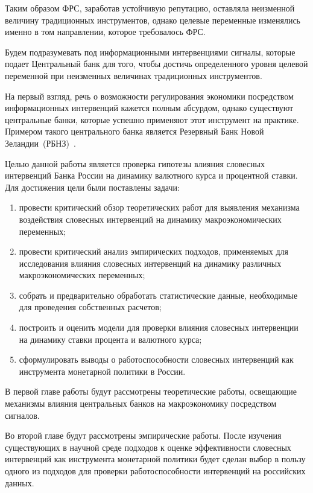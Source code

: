 Таким образом ФРС, заработав устойчивую репутацию, оставляла неизменной величину традиционных инструментов, однако целевые переменные изменялись именно в том направлении, которое требовалось ФРС.

Будем подразумевать под информационными интервенциями сигналы, которые подает Центральный банк для того, чтобы достичь определенного уровня целевой переменной при неизменных величинах традиционных инструментов.

На первый взгляд, речь о возможности регулирования экономики посредством информационных интервенций кажется полным абсурдом, однако существуют центральные банки, которые успешно применяют этот инструмент на практике. Примером такого центрального банка является Резервный Банк Новой Зеландии~(РБНЗ)~\cite{guthrie2000open}.

Целью данной работы является проверка гипотезы влияния словесных интервенций Банка России на динамику валютного курса и процентной ставки. Для достижения цели были поставлены задачи: 

\begin{enumerate}
\item провести критический обзор теоретических работ для выявления механизма воздействия словесных интервенций на динамику макроэкономических переменных;

\item провести критический анализ эмпирических подходов, применяемых для исследования влияния словесных интервенций на динамику различных макроэкономических переменных;

\item собрать и предварительно обработать статистические данные, необходимые для проведения собственных расчетов;

\item построить и оценить модели для проверки влияния словесных интервенции на динамику ставки процента и валютного курса;

\item сформулировать выводы о работоспособности словесных интервенций как инструмента монетарной политики в России.
\end{enumerate}

В первой главе работы будут рассмотрены теоретические работы, освещающие механизмы влияния центральных банков на макроэкономику посредством сигналов.

Во второй главе будут рассмотрены эмпирические работы. После изучения существующих в научной среде подходов к оценке эффективности словесных интервенций как инструмента монетарной политики будет сделан выбор в пользу одного из подходов для проверки работоспособности интервенций на российских данных. 


